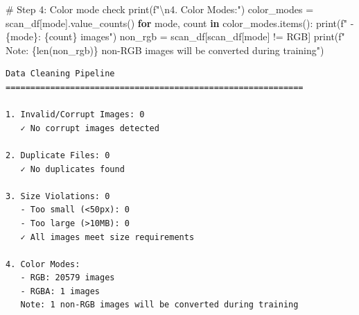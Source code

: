 \documentclass[
  letterpaper,
  DIV=11,
  numbers=noendperiod]{scrartcl}
\newenvironment{Shaded}{\begin{snugshade}}{\end{snugshade}}
\newcommand{\BuiltInTok}[1]{\textcolor[rgb]{0.00,0.23,0.31}{#1}}
\newcommand{\CharTok}[1]{\textcolor[rgb]{0.13,0.47,0.30}{#1}}
\newcommand{\CommentTok}[1]{\textcolor[rgb]{0.37,0.37,0.37}{#1}}
\newcommand{\ControlFlowTok}[1]{\textcolor[rgb]{0.00,0.23,0.31}{\textbf{#1}}}
\newcommand{\KeywordTok}[1]{\textcolor[rgb]{0.00,0.23,0.31}{\textbf{#1}}}
\newcommand{\NormalTok}[1]{\textcolor[rgb]{0.00,0.23,0.31}{#1}}
\newcommand{\OperatorTok}[1]{\textcolor[rgb]{0.37,0.37,0.37}{#1}}
\newcommand{\SpecialCharTok}[1]{\textcolor[rgb]{0.37,0.37,0.37}{#1}}
\newcommand{\SpecialStringTok}[1]{\textcolor[rgb]{0.13,0.47,0.30}{#1}}
\newcommand{\StringTok}[1]{\textcolor[rgb]{0.13,0.47,0.30}{#1}}
\renewenvironment{Shaded}{%
  \begin{tcolorbox}[%
    enhanced,%
    colback=codebg,%
    colframe=codebg,%
    borderline west={3pt}{0pt}{sectionblue},%
    boxrule=0pt,%
    arc=0pt,%
    boxsep=5pt,%
    left=2mm,%
    right=2mm,%
    top=2mm,%
    bottom=2mm%
  ]%
}{%
  \end{tcolorbox}%
}
\begin{document}
\begin{Shaded}
\begin{Highlighting}[]
\CommentTok{\# Step 4: Color mode check}
\BuiltInTok{print}\NormalTok{(}\SpecialStringTok{f"}\CharTok{\textbackslash{}n}\SpecialStringTok{4. Color Modes:"}\NormalTok{)}
\NormalTok{color\_modes }\OperatorTok{=}\NormalTok{ scan\_df[}\StringTok{\textquotesingle{}mode\textquotesingle{}}\NormalTok{].value\_counts()}
\ControlFlowTok{for}\NormalTok{ mode, count }\KeywordTok{in}\NormalTok{ color\_modes.items():}
    \BuiltInTok{print}\NormalTok{(}\SpecialStringTok{f"   {-} }\SpecialCharTok{\{}\NormalTok{mode}\SpecialCharTok{\}}\SpecialStringTok{: }\SpecialCharTok{\{}\NormalTok{count}\SpecialCharTok{\}}\SpecialStringTok{ images"}\NormalTok{)}
\NormalTok{non\_rgb }\OperatorTok{=}\NormalTok{ scan\_df[scan\_df[}\StringTok{\textquotesingle{}mode\textquotesingle{}}\NormalTok{] }\OperatorTok{!=} \StringTok{\textquotesingle{}RGB\textquotesingle{}}\NormalTok{]}
\BuiltInTok{print}\NormalTok{(}\SpecialStringTok{f"   Note: }\SpecialCharTok{\{}\BuiltInTok{len}\NormalTok{(non\_rgb)}\SpecialCharTok{\}}\SpecialStringTok{ non{-}RGB images will be converted during training"}\NormalTok{)}
\end{Highlighting}
\end{Shaded}

\begin{verbatim}
Data Cleaning Pipeline
============================================================

1. Invalid/Corrupt Images: 0
   ✓ No corrupt images detected

2. Duplicate Files: 0
   ✓ No duplicates found

3. Size Violations: 0
   - Too small (<50px): 0
   - Too large (>10MB): 0
   ✓ All images meet size requirements

4. Color Modes:
   - RGB: 20579 images
   - RGBA: 1 images
   Note: 1 non-RGB images will be converted during training
\end{verbatim}
\end{document}
